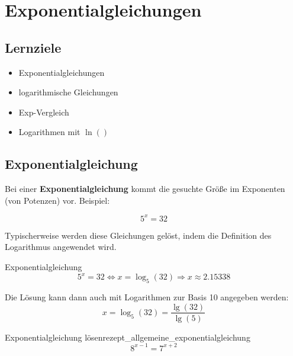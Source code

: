 

\section{Exponentialgleichungen}

\subsection*{Lernziele}

\begin{itemize}
\item Exponentialgleichungen
  \item logarithmische Gleichungen 
\item Exp-Vergleich
\item Logarithmen mit $\ln()$
\end{itemize}

\subsection{Exponentialgleichung}
Bei einer \textbf{Exponentialgleichung} kommt die gesuchte Größe im
Exponenten (von Potenzen) vor. Beispiel:

$$5^x = 32$$

Typischerweise werden diese Gleichungen gelöst, indem die Definition
des Logarithmus angewendet wird.

\begin{rezept}{Exponentialgleichung}{}
$$5^x=32 \Longleftrightarrow x=\log_5(32) \Longrightarrow x \approx 2.15338$$

Die Lösung kann dann auch mit Logarithmen zur Basis 10 angegeben
werden:
$$x = \log_5(32) = \frac{\lg(32)}{\lg(5)}$$
\end{rezept}
\newpage



\begin{rezept}{Exponentialgleichung lösen}{rezept_allgemeine_exponentialgleichung}
  $$8^{x-1}=7^{x+2}$$
\end{rezept}

\GESO{\newpage}


